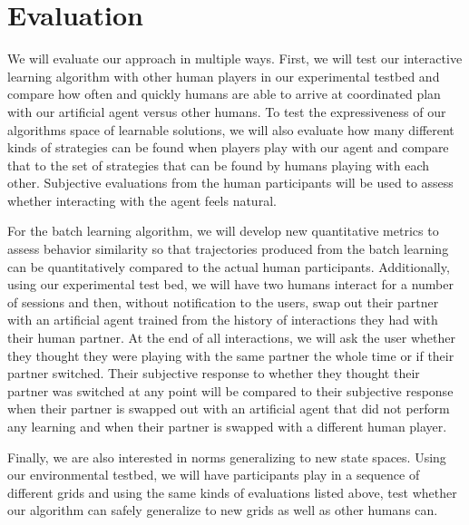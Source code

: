 
\section{Evaluation}
We will evaluate our approach in multiple ways. First, we will test our interactive learning algorithm with other human players in our experimental testbed and compare how often and quickly humans are able to arrive at coordinated plan with our artificial agent versus other humans. To test the expressiveness of our algorithms space of learnable solutions, we will also evaluate how many different kinds of strategies can be found when players play with our agent and compare that to the set of strategies that can be found by humans playing with each other.
Subjective evaluations from the human participants will be used to assess whether interacting with the agent feels natural. 

For the batch learning algorithm, we will develop new quantitative metrics to assess behavior similarity so that trajectories produced from the batch learning can be quantitatively compared to the actual human participants. Additionally, using our experimental test bed, we will have two humans interact for a number of sessions and then, without notification to the users, swap out their partner with an artificial agent trained from the history of interactions they had with their human partner. At the end of all interactions, we will ask the user whether they thought they were playing with the same partner the whole time or if their partner switched. Their subjective response to whether they thought their partner was switched at any point will be compared to their subjective response when their partner is swapped out with an artificial agent that did not perform any learning and when their partner is swapped with a different human player.

Finally, we are also interested in norms generalizing to new state spaces. Using our environmental testbed, we will have participants play in a sequence of different grids and using the same kinds of evaluations listed above, test whether our algorithm can safely generalize to new grids as well as other humans can.